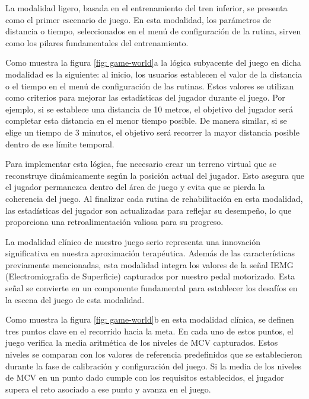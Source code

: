 La modalidad ligero, basada en el entrenamiento del tren inferior, se presenta como el primer escenario de juego. En esta modalidad, los parámetros de distancia o tiempo, seleccionados en el menú de configuración de la rutina, sirven como los pilares fundamentales del entrenamiento.

\vspace{5pt}
Como muestra la figura \ref{fig: game-world}a la lógica subyacente del juego en dicha modalidad es la siguiente: al inicio, los usuarios establecen el valor de la distancia o el tiempo en el menú de configuración de las rutinas. Estos valores se utilizan como criterios para mejorar las estadísticas del jugador durante el juego. Por ejemplo, si se establece una distancia de 10 metros, el objetivo del jugador será completar esta distancia en el menor tiempo posible. De manera similar, si se elige un tiempo de 3 minutos, el objetivo será recorrer la mayor distancia posible dentro de ese límite temporal.

\vspace{5pt}
Para implementar esta lógica, fue necesario crear un terreno virtual que se reconstruye dinámicamente según la posición actual del jugador. Esto asegura que el jugador permanezca dentro del área de juego y evita que se pierda la coherencia del juego. Al finalizar cada rutina de rehabilitación en esta modalidad, las estadísticas del jugador son actualizadas para reflejar su desempeño, lo que proporciona una retroalimentación valiosa para su progreso.

La modalidad clínico de nuestro juego serio representa una innovación significativa en nuestra aproximación terapéutica. Además de las características previamente mencionadas, esta modalidad integra los valores de la señal IEMG (Electromiografía de Superficie) capturados por nuestro pedal motorizado. Esta señal se convierte en un componente fundamental para establecer los desafíos en la escena del juego de esta modalidad.

\vspace{5pt}
Como muestra la figura \ref{fig: game-world}b en esta modalidad clínica, se definen tres puntos clave en el recorrido hacia la meta. En cada uno de estos puntos, el juego verifica la media aritmética de los niveles de MCV capturados. Estos niveles se comparan con los valores de referencia predefinidos que se establecieron durante la fase de calibración y configuración del juego. Si la media de los niveles de MCV en un punto dado cumple con los requisitos establecidos, el jugador supera el reto asociado a ese punto y avanza en el juego.

